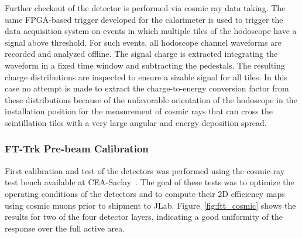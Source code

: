 Further checkout of the detector is performed via cosmic ray data taking. The same FPGA-based trigger developed
for the calorimeter is used to trigger the data acquisition system on events in which multiple tiles of the hodoscope
have a signal above threshold. For such events, all hodoscope channel waveforms are recorded and analyzed offline.
The signal charge is extracted integrating the waveform in a fixed time window and subtracting the pedestals. The
resulting charge distributions are inspected to ensure a sizable signal for all tiles. In this case no attempt is made to
extract the charge-to-energy conversion factor from these distributions because of the unfavorable orientation of
the hodoscope in the installation position for the measurement of cosmic rays that can cross the scintillation tiles with
a very large angular and energy deposition spread.

\subsubsection{FT-Trk Pre-beam Calibration}

First calibration and test of the detectors was performed using the cosmic-ray test bench available at
CEA-Saclay~\cite{mm}. The goal of these tests was to optimize the operating conditions of the detectors and to
compute their 2D efficiency maps using cosmic muons prior to shipment to JLab. Figure~\ref{fig:ftt_cosmic} shows
the results for two of the four detector layers, indicating a good uniformity of the response over the full active area.

